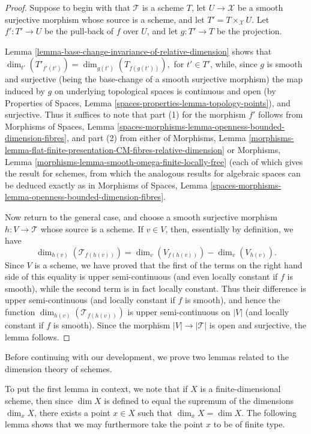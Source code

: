 \begin{proof}
Suppose to begin with that $\mathcal{T}$ is a scheme $T$,
let $U \to \mathcal{X}$ be a smooth surjective morphism whose source
is a scheme, and let $T' = T \times_{\mathcal{X}} U$.
Let $f': T' \to U$ be the pull-back of $f$ over $U$,
and let $g: T' \to T$ be the projection.

\medskip\noindent
Lemma \ref{lemma-base-change-invariance-of-relative-dimension}
shows that $\dim_{t'}(T'_{f'(t')}) = \dim_{g(t')}(T_{f(g(t'))}),$
for $t' \in T'$, while,
since $g$ is smooth and surjective (being the base-change
of a smooth surjective morphism) the map induced by $g$ on underlying
topological spaces is continuous and open
(by
Properties of Spaces, Lemma \ref{spaces-properties-lemma-topology-points}), and
surjective. Thus it suffices to note that part (1) for the morphism $f'$
follows from
Morphisms of Spaces, Lemma
\ref{spaces-morphisms-lemma-openness-bounded-dimension-fibres}, and part (2)
from either of Morphisms, Lemma
\ref{morphisms-lemma-flat-finite-presentation-CM-fibres-relative-dimension}
or
Morphisms, Lemma \ref{morphisms-lemma-smooth-omega-finite-locally-free}
(each of which gives the result for schemes, from which
the analogous results for algebraic spaces can
be deduced exactly as in
Morphisms of Spaces, Lemma
\ref{spaces-morphisms-lemma-openness-bounded-dimension-fibres}.

\medskip\noindent
Now return to the general case,
and choose a smooth surjective morphism
$h:V \to \mathcal{T}$ whose source is a scheme.
If $v \in V$, then, essentially by definition,
we have
$$
\dim_{h(v)}(\mathcal{T}_{f(h(v))}) =
\dim_{v}(V_{f(h(v))}) - \dim_{v}(V_{h(v)}).
$$
Since $V$ is a scheme, we have proved that the first
of the terms on the right hand side of this equality
is upper semi-continuous (and even locally
constant if $f$ is smooth), while the second term is
in fact locally constant.
Thus their difference is upper semi-continuous
(and locally constant if $f$ is smooth),
and hence the function
$\dim_{h(v)}(\mathcal{T}_{f(h(v))})$
is upper semi-continuous on $|V|$ (and locally
constant if $f$ is smooth).
Since the morphism $|V| \to |\mathcal{T}|$ is open and surjective,
the lemma follows.
\end{proof}

\noindent
Before continuing with our development,
we prove two lemmas related to the dimension theory of schemes.

\medskip\noindent
To put the first lemma in context,
we note that if $X$ is a finite-dimensional scheme, then since $\dim X$
is defined to equal the supremum of the dimensions $\dim_x X$,
there exists a point $x \in X$ such that $\dim_x X = \dim X$.
The following lemma shows that we may furthermore take the point
$x$ to be of finite type.

